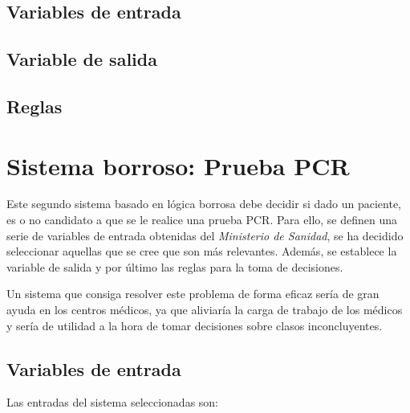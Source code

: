 \documentclass[12pt,a4paper, xcolor=table]{article}
\begin{document}
\subsection{Variables de entrada}

\subsection{Variable de salida}

\subsection{Reglas}



\section{Sistema borroso: Prueba PCR}

Este segundo sistema basado en lógica borrosa debe decidir si dado un paciente, es o no candidato a que se le realice una prueba PCR. Para ello, se definen una serie de variables de entrada obtenidas del \textit{Ministerio de Sanidad}\cite{paciente}, se ha decidido seleccionar aquellas que se cree que son más relevantes. Además, se establece la variable de salida y por último las reglas para la toma de decisiones.

\vspace{2mm}

Un sistema que consiga resolver este problema de forma eficaz sería de gran ayuda en los centros médicos, ya que aliviaría la carga de trabajo de los médicos y sería de utilidad a la hora de tomar decisiones sobre clasos inconcluyentes.


\subsection{Variables de entrada}

Las entradas del sistema seleccionadas son:
\end{document}
